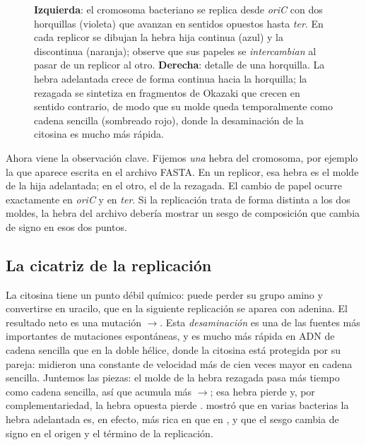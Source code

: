 \begin{figure}[t]
\caption[Replicación bidireccional y horquilla de replicación]{\textbf{Izquierda}: el cromosoma bacteriano se replica desde \emph{oriC} con dos horquillas (violeta) que avanzan en sentidos opuestos hasta \emph{ter}. En cada replicor se dibujan la hebra hija continua (azul) y la discontinua (naranja); observe que sus papeles se \emph{intercambian} al pasar de un replicor al otro. \textbf{Derecha}: detalle de una horquilla. La hebra adelantada crece de forma continua hacia la horquilla; la rezagada se sintetiza en fragmentos de Okazaki que crecen en sentido contrario, de modo que su molde queda temporalmente como cadena sencilla (sombreado rojo), donde la desaminación de la citosina es mucho más rápida.}
\label{fig:01-replicacion}
\end{figure}

Ahora viene la observación clave. Fijemos \emph{una} hebra del cromosoma, por ejemplo la que aparece escrita en el archivo FASTA. En un replicor, esa hebra es el molde de la hija adelantada; en el otro, el de la rezagada. El cambio de papel ocurre exactamente en \emph{oriC} y en \emph{ter}. Si la replicación trata de forma distinta a los dos moldes, la hebra del archivo debería mostrar un sesgo de composición que cambia de signo en esos dos puntos.

\subsection{La cicatriz de la replicación}

La citosina tiene un punto débil químico: puede perder su grupo amino y convertirse en uracilo, que en la siguiente replicación se aparea con adenina. El resultado neto es una mutación $\to$. Esta \emph{desaminación} es una de las fuentes más importantes de mutaciones espontáneas, y es mucho más rápida en ADN de cadena sencilla que en la doble hélice, donde la citosina está protegida por su pareja: \textcite{c01-frederico1990} midieron una constante de velocidad más de cien veces mayor en cadena sencilla. Juntemos las piezas: el molde de la hebra rezagada pasa más tiempo como cadena sencilla, así que acumula más $\to$; esa hebra pierde  y, por complementariedad, la hebra opuesta pierde . \textcite{c01-lobry1996} mostró que en varias bacterias la hebra adelantada es, en efecto, más rica en  que en , y que el sesgo cambia de signo en el origen y el término de la replicación.

